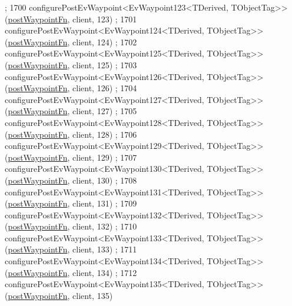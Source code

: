 \begin{DoxyCode}
      ;
1700     configurePostEvWaypoint<EvWaypoint123<TDerived, TObjectTag>>(\hyperlink{classmove__base__z__client_1_1WaypointEventDispatcher_acc538eb7506c13f7cca2268a1742dadd}{postWaypointFn}, client, 123)
      ;
1701     configurePostEvWaypoint<EvWaypoint124<TDerived, TObjectTag>>(\hyperlink{classmove__base__z__client_1_1WaypointEventDispatcher_acc538eb7506c13f7cca2268a1742dadd}{postWaypointFn}, client, 124)
      ;
1702     configurePostEvWaypoint<EvWaypoint125<TDerived, TObjectTag>>(\hyperlink{classmove__base__z__client_1_1WaypointEventDispatcher_acc538eb7506c13f7cca2268a1742dadd}{postWaypointFn}, client, 125)
      ;
1703     configurePostEvWaypoint<EvWaypoint126<TDerived, TObjectTag>>(\hyperlink{classmove__base__z__client_1_1WaypointEventDispatcher_acc538eb7506c13f7cca2268a1742dadd}{postWaypointFn}, client, 126)
      ;
1704     configurePostEvWaypoint<EvWaypoint127<TDerived, TObjectTag>>(\hyperlink{classmove__base__z__client_1_1WaypointEventDispatcher_acc538eb7506c13f7cca2268a1742dadd}{postWaypointFn}, client, 127)
      ;
1705     configurePostEvWaypoint<EvWaypoint128<TDerived, TObjectTag>>(\hyperlink{classmove__base__z__client_1_1WaypointEventDispatcher_acc538eb7506c13f7cca2268a1742dadd}{postWaypointFn}, client, 128)
      ;
1706     configurePostEvWaypoint<EvWaypoint129<TDerived, TObjectTag>>(\hyperlink{classmove__base__z__client_1_1WaypointEventDispatcher_acc538eb7506c13f7cca2268a1742dadd}{postWaypointFn}, client, 129)
      ;
1707     configurePostEvWaypoint<EvWaypoint130<TDerived, TObjectTag>>(\hyperlink{classmove__base__z__client_1_1WaypointEventDispatcher_acc538eb7506c13f7cca2268a1742dadd}{postWaypointFn}, client, 130)
      ;
1708     configurePostEvWaypoint<EvWaypoint131<TDerived, TObjectTag>>(\hyperlink{classmove__base__z__client_1_1WaypointEventDispatcher_acc538eb7506c13f7cca2268a1742dadd}{postWaypointFn}, client, 131)
      ;
1709     configurePostEvWaypoint<EvWaypoint132<TDerived, TObjectTag>>(\hyperlink{classmove__base__z__client_1_1WaypointEventDispatcher_acc538eb7506c13f7cca2268a1742dadd}{postWaypointFn}, client, 132)
      ;
1710     configurePostEvWaypoint<EvWaypoint133<TDerived, TObjectTag>>(\hyperlink{classmove__base__z__client_1_1WaypointEventDispatcher_acc538eb7506c13f7cca2268a1742dadd}{postWaypointFn}, client, 133)
      ;
1711     configurePostEvWaypoint<EvWaypoint134<TDerived, TObjectTag>>(\hyperlink{classmove__base__z__client_1_1WaypointEventDispatcher_acc538eb7506c13f7cca2268a1742dadd}{postWaypointFn}, client, 134)
      ;
1712     configurePostEvWaypoint<EvWaypoint135<TDerived, TObjectTag>>(\hyperlink{classmove__base__z__client_1_1WaypointEventDispatcher_acc538eb7506c13f7cca2268a1742dadd}{postWaypointFn}, client, 135)

\end{DoxyCode}
